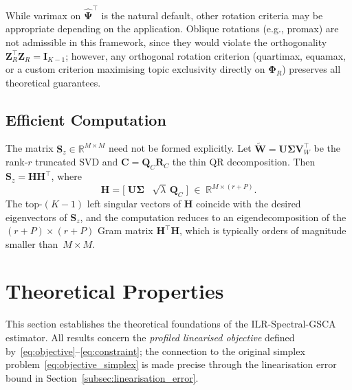 \begin{remark}
\label{rem:alternative_rotations}
While varimax on $\hat{\boldsymbol{\Psi}}^{\!\top}$ is the natural
default, other rotation criteria may be appropriate depending on the
application. Oblique rotations (e.g., promax) are not admissible in
this framework, since they would violate the orthogonality
$\mathbf{Z}_R^{\!\top}\mathbf{Z}_R = \mathbf{I}_{K-1}$; however,
any orthogonal rotation criterion (quartimax, equamax, or a custom
criterion maximising topic exclusivity directly on
$\boldsymbol{\Phi}_R$) preserves all theoretical guarantees.
\end{remark}


\subsection{Efficient Computation}
\label{subsec:computation}

The matrix $\mathbf{S}_z\in\mathbb{R}^{M\times M}$ need not be formed
explicitly. Let
$\widetilde{\mathbf{W}} = \mathbf{U}\boldsymbol{\Sigma}\mathbf{V}_W^{\!\top}$
be the rank-$r$ truncated SVD and
$\mathbf{C} = \mathbf{Q}_C\mathbf{R}_C$ the thin QR decomposition.
Then $\mathbf{S}_z = \mathbf{H}\mathbf{H}^{\!\top}$, where
\begin{equation}
  \mathbf{H}
  = \bigl[\;
      \mathbf{U}\boldsymbol{\Sigma}
      \;\;\;
      \sqrt{\lambda}\,\mathbf{Q}_C
    \;\bigr]
  \;\in\;\mathbb{R}^{M\times(r+P)}.
  \label{eq:H_matrix}
\end{equation}
The top-$(K{-}1)$ left singular vectors of $\mathbf{H}$ coincide with
the desired eigenvectors of $\mathbf{S}_z$, and the computation reduces
to an eigendecomposition of the $(r{+}P)\times(r{+}P)$ Gram matrix
$\mathbf{H}^{\!\top}\mathbf{H}$, which is typically orders of magnitude
smaller than~$M\times M$.



\section{Theoretical Properties}
\label{sec:theory}

This section establishes the theoretical foundations of the ILR-Spectral-GSCA
estimator. All results concern the \emph{profiled linearised objective}
defined by~\eqref{eq:objective}--\eqref{eq:constraint}; the connection
to the original simplex problem~\eqref{eq:objective_simplex} is made
precise through the linearisation error bound in
Section~\ref{subsec:linearisation_error}.

